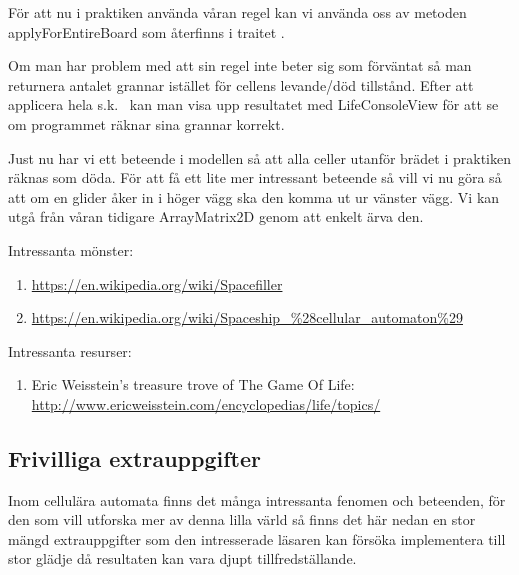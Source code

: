         För att nu i praktiken använda våran regel kan vi använda oss av metoden applyForEntireBoard som återfinns i traitet .

        Om man har problem med att sin regel inte beter sig som förväntat så man returnera antalet grannar istället
        för cellens levande/död tillstånd. Efter att applicera hela s.k.\  kan man visa upp resultatet med LifeConsoleView för att se om programmet räknar sina grannar korrekt.


    Just nu har vi ett beteende i modellen så att alla celler utanför brädet i praktiken räknas som döda.
    För att få ett lite mer intressant beteende så vill vi nu göra så att om en glider åker in i höger vägg
    ska den komma ut ur vänster vägg. Vi kan utgå från våran tidigare ArrayMatrix2D genom att enkelt ärva den.




Intressanta mönster:

\begin{enumerate}
    \item \url{https://en.wikipedia.org/wiki/Spacefiller}
    \item \url{https://en.wikipedia.org/wiki/Spaceship_\%28cellular_automaton\%29}
\end{enumerate}

Intressanta resurser:

\begin{enumerate}
    \item Eric Weisstein's treasure trove of The Game Of Life: \url{http://www.ericweisstein.com/encyclopedias/life/topics/}
\end{enumerate}


\subsection{Frivilliga extrauppgifter}

Inom cellulära automata finns det många intressanta fenomen och beteenden,
för den som vill utforska mer av denna lilla värld så finns det här nedan en stor mängd extrauppgifter som den
intresserade läsaren kan försöka implementera till stor glädje då resultaten kan vara djupt tillfredställande.

